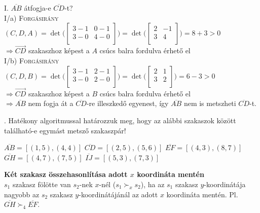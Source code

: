 \documentclass[12pt]{article}
\begin{document}
\noindent I. $\overline{AB}$ átfogja-e $\overline{CD}$-t? \\
I/a) {\scshape Forgásirány}$(C,D,A)=\det\Bigg(\begin{bmatrix}
3-1 & 0-1 \\
3-0 & 4-0 \\
\end{bmatrix}\Bigg)=\det\Bigg(\begin{bmatrix}
2  & -1 \\
3  & 4 \\
\end{bmatrix}\Bigg) = 8+3 > 0$ \\$\Rightarrow \overrightarrow{CD}$ szakaszhoz 
képest a $A$ csúcs balra fordulva érhető el  \\
I/b) {\scshape Forgásirány}$(C,D,B)=\det\Bigg(\begin{bmatrix}
3-1 & 2-1 \\
3-0 & 2-0 \\
\end{bmatrix}\Bigg)=\det\Bigg(\begin{bmatrix}
2  & 1 \\
3  & 2 \\
\end{bmatrix}\Bigg) = 6-3 > 0$ \\$\Rightarrow \overrightarrow{CD}$ szakaszhoz 
képest a $B$ csúcs balra fordulva érhető el  \\
$\Rightarrow \overline{AB}$ nem fogja át a $\overline{CD}$-re illeszkedő 
egyenest, így $\overline{AB}$ nem is metszheti $\overline{CD}$-t.


. Hatékony algoritmussal határozzuk meg, hogy az alábbi szakaszok 
között található-e egymást metsző szakaszpár!

\noindent $\overline{AB}=[(1,5),(4,4)]$ \hfill $\overline{CD}=[(2,5),(5,6)]$ 
\hfill
$\overline{EF}=[(4,3),(8,7)]$ \hfill $\overline{GH}=[(4,7),(7,5)]$ \hfill 
$\overline{IJ}=[(5,3),(7,3)]$

\textbf{Két szakasz összehasonlítása adott $x$ koordináta mentén}\\
$s_1$ szakasz fölötte van $s_2$-nek $x$-nél ($s_1 \succ_x s_2$), ha az $s_1$ 
szakasz $y$-koordinátája nagyobb az $s_2$ szakasz $y$-koordinátájánál az adott 
$x$ koordináta mentén.
Pl. $\overline{GH} \succ_4 \overline{EF}$.
\end{document}
